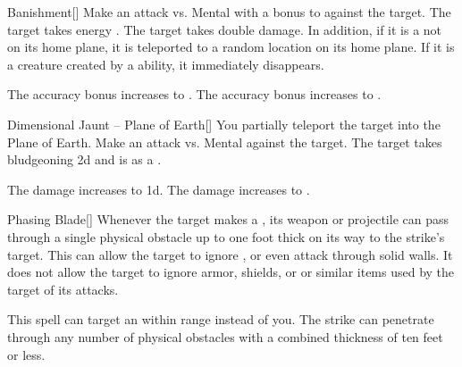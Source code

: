 \lowercase{\hypertarget{spell:Banishment}{}}\label{spell:Banishment}
\begin{freeability}[Rank 3]{\hypertarget{spell:Banishment}{Banishment}}[]
Make an attack vs. Mental with a  bonus to  against the target.
\hit The target takes energy .
\crit The target takes double damage.
In addition, if it is a  not on its home plane, it is teleported to a random location on its home plane.
If it is a creature created by a  ability, it immediately disappears.

\rankline
{} The accuracy bonus increases to .
 The accuracy bonus increases to .

\end{freeability}
\vspace{0.25em}



\lowercase{\hypertarget{spell:Dimensional Jaunt -- Plane of Earth}{}}\label{spell:Dimensional Jaunt -- Plane of Earth}
\begin{freeability}[Rank 3]{\hypertarget{spell:Dimensional Jaunt -- Plane of Earth}{Dimensional Jaunt -- Plane of Earth}}[]
You partially teleport the target into the Plane of Earth.
Make an attack vs. Mental against the target.
\hit The target takes bludgeoning  \minus2d and is  as a .

\rankline
{} The damage increases to  \minus1d.
 The damage increases to .

\end{freeability}
\vspace{0.25em}



\lowercase{\hypertarget{spell:Phasing Blade}{}}\label{spell:Phasing Blade}
\begin{freeability}[Rank 3]{\hypertarget{spell:Phasing Blade}{Phasing Blade}}[]
Whenever the target makes a , its weapon or projectile can pass through a single physical obstacle up to one foot thick on its way to the strike's target.
This can allow the target to ignore , or even attack through solid walls.
It does not allow the target to ignore armor, shields, or or similar items used by the target of its attacks.

\rankline
{} This spell can target an  within \rngmed range instead of you.
 The strike can penetrate through any number of physical obstacles with a combined thickness of ten feet or less.

\end{freeability}
\vspace{0.25em}




